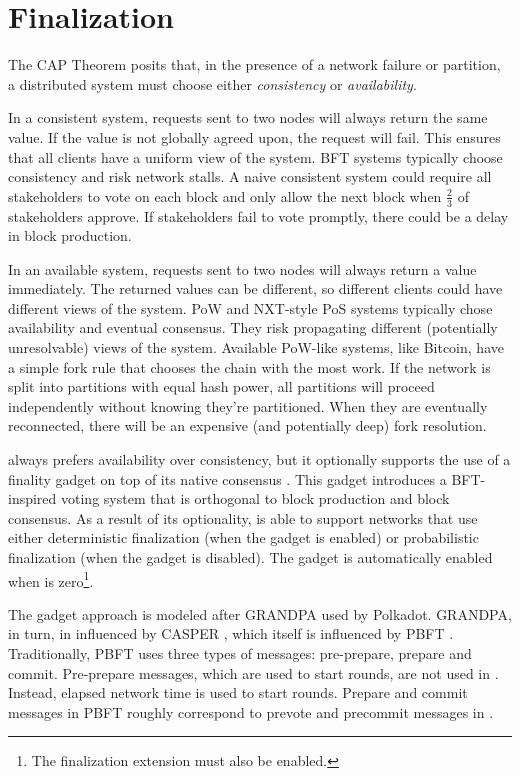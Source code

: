 \section{Finalization}
\label{sec:finalization}


The CAP Theorem posits that, in the presence of a network failure or partition,
a distributed system must choose either \emph{consistency} or \emph{availability}.

In a consistent system, requests sent to two nodes will always return the same value.
If the value is not globally agreed upon, the request will fail.
This ensures that all clients have a uniform view of the system.
BFT systems typically choose consistency and risk network stalls.
A naive consistent system could require all stakeholders to vote on each block
and only allow the next block when $\frac{2}{3}$ of stakeholders approve.
If stakeholders fail to vote promptly, there could be a delay in block production.

In an available system, requests sent to two nodes will always return a value immediately.
The returned values can be different, so different clients could have different views of the system.
PoW and NXT-style PoS systems typically chose availability and eventual consensus.
They risk propagating different (potentially unresolvable) views of the system.
Available PoW-like systems, like Bitcoin, have a simple fork rule that chooses the chain with the most work.
If the network is split into partitions with equal hash power, all partitions will proceed independently without knowing they’re partitioned.
When they are eventually reconnected, there will be an expensive (and potentially deep) fork resolution.

\codenamespace always prefers availability over consistency, but it optionally supports the use of a finality gadget on top of its native consensus .
This gadget introduces a BFT-inspired voting system that is orthogonal to block production and block consensus.
As a result of its optionality, \codenamespace is able to support networks that use either deterministic finalization (when the gadget is enabled) or probabilistic finalization (when the gadget is disabled).
The gadget is automatically enabled when  is zero\footnote{
	The finalization extension must also be enabled.
}.

The gadget approach is modeled after GRANDPA \cite{Stewart2020grandpa} used by Polkadot.
GRANDPA, in turn, in influenced by CASPER \cite{CasperFfg}, which itself is influenced by PBFT \cite{Pbft1999}.
Traditionally, PBFT uses three types of messages: pre-prepare, prepare and commit.
Pre-prepare messages, which are used to start rounds, are not used in \codenamespace.
Instead, elapsed network time  is used to start rounds.
Prepare and commit messages in PBFT roughly correspond to prevote and precommit messages in \codenamespace.

